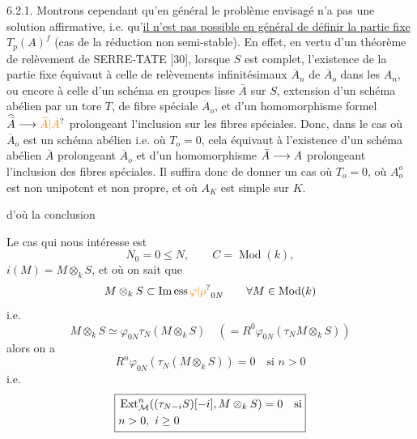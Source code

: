 6.2.1. Montrons cependant qu'en général le problème envisagé n'a pas une solution affirmative, i.e. qu'\uline{il n'est pas possible en général de définir la partie fixe} $T_p(A)^f$ (cas de la réduction non semi-stable). En effet, en vertu d'un théorème de relèvement de SERRE-TATE [30], lorsque $S$ est complet, l'existence de la partie fixe équivaut à celle de relèvements infinitésimaux $\overline A_n$ de $\overline A_o$ dans les $A_n$, ou encore à celle d'un schéma en groupes lisse $\bar A$ sur $S$, extension d'un schéma abélien par un tore $T$, de fibre spéciale $\overline A_o$, et d'un homomorphisme formel $\widehat{\bar A}\handwritten{\longrightarrow}\unsure{\widehat A|\dot A}$ prolongeant l'inclusion sur les fibres spéciales. Donc, dans le cas où $\overline A_o$ est un schéma abélien i.e. où $T_o=0$, cela équivaut à l'existence d'un schéma abélien $\bar A$ prolongeant $\overline A_o$ et d'un homomorphisme $\bar A\longrightarrow A$ prolongeant l'inclusion des fibres spéciales. Il suffira donc de donner un cas où $T_o=0$, où $A_o^o$ est non unipotent et non propre, et où $A_K$ est simple sur $K$.


d'où la conclusion

Le cas qui nous intéresse est
\[
N_0=0\leq N,\qquad C=\operatorname{Mod}(k),
\]
$i(M)=M\otimes_k S$, et où on sait que
\[
M\otimes_k S\subset\operatorname{Im\,ess}\unsure{\varphi|\rho}_{0N}\qquad\forall M\in\operatorname{Mod}(k)
\]
i.e.
\[
M\otimes_k S\simeq\varphi_{0N}\tau_N(M\otimes_k S)\quad(=R^0\varphi_{0N}(\tau_N M\otimes_k S))
\]
\deleted{\[
\begin{gathered}
\rotatebox{90}{$=$}\\
\operatorname{Hom}((\tau_{N-i}S)[-i],M\otimes_{\unsure{k|r}}
\end{gathered}
\]}
alors on a
\[
R^n\varphi_{0N}(\tau_N(M\otimes_k S))=0\quad\text{si }n>0
\]
i.e.
\[
\boxed{\begin{aligned}
&\operatorname{Ext}_{\mathcal M}^n((\tau_{N-i}S)[-i],M\otimes_k S)=0\quad\text{si}\\
&\hfill n>0,\ i\geq 0
\end{aligned}}
\]

